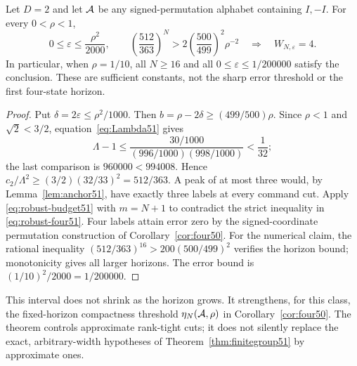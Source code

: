 \begin{corollary}
\label{cor:robust-four51}
Let $D=2$ and let $\mathcal A$ be any signed-permutation alphabet containing
$I,-I$. For every $0<\rho<1$,
\begin{equation}\label{eq:robust-four51}
 0\le\varepsilon\le\frac{\rho^2}{2000},\qquad
 \left(\frac{512}{363}\right)^N>
       2\left(\frac{500}{499}\right)^2\rho^{-2}
 \quad\Longrightarrow\quad W_{N,\varepsilon}=4.
\end{equation}
In particular, when $\rho=1/10$, all $N\ge16$ and all
$0\le\varepsilon\le1/200000$ satisfy the conclusion. These are
sufficient constants, not the sharp error threshold or the first
four-state horizon.
\end{corollary}
\begin{proof}
Put $\delta=2\varepsilon\le\rho^2/1000$. Then
$b=\rho-2\delta\ge(499/500)\rho$. Since $\rho<1$ and
$\sqrt2<3/2$, equation~\eqref{eq:Lambda51} gives
\[
 \Lambda-1\le
 \frac{30/1000}{(996/1000)(998/1000)}<\frac1{32};
\]
the last comparison is $960000<994008$. Hence
$c_2/\Lambda^2\ge(3/2)(32/33)^2=512/363$.
A peak of at most three would, by Lemma~\ref{lem:anchor51}, have
exactly three labels at every command cut. Apply
\eqref{eq:robust-budget51} with $m=N+1$ to contradict the strict
inequality in \eqref{eq:robust-four51}. Four labels attain error
zero by the signed-coordinate permutation construction of
Corollary~\ref{cor:four50}.
For the numerical claim, the rational inequality
$(512/363)^{16}>200(500/499)^2$ verifies the horizon bound;
monotonicity gives all larger horizons. The error bound is
$(1/10)^2/2000=1/200000$.
\end{proof}

This interval does not shrink as the horizon grows. It strengthens,
for this class, the fixed-horizon compactness threshold
$\eta_N(\mathcal A,\rho)$ in Corollary~\ref{cor:four50}. The theorem
controls approximate rank-tight cuts; it does not silently replace
the exact, arbitrary-width hypotheses of
Theorem~\ref{thm:finitegroup51} by approximate ones.
